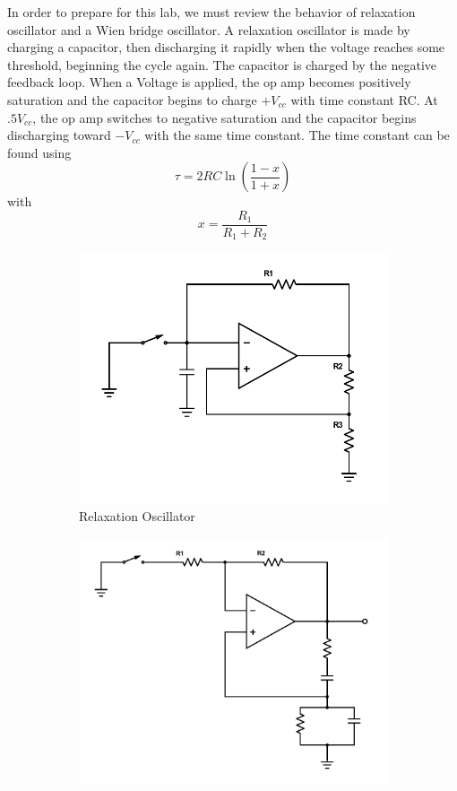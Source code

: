 \documentclass[11pt,letterpaper,onecolumn]{article}
\begin{document}
 In order to prepare for this lab, we must review the behavior of relaxation oscillator and a Wien bridge oscillator. A relaxation oscillator is made by charging a capacitor, then discharging it rapidly when the voltage reaches some threshold, beginning the cycle again. The capacitor is charged by the negative feedback loop. When a Voltage is applied, the op amp becomes positively saturation and the capacitor begins to charge $+V_{cc}$ with time constant RC. At $.5V_{cc}$, the op amp switches to negative saturation and the capacitor begins discharging toward $-V_{cc}$ with the same time constant. The time constant can be found using 
 $$\tau = 2RC\ln\left(\frac{1-x}{1+x}\right)$$
 with 
 $$ x = \frac{R_1}{R_1 + R_2}$$
 
\begin{figure}[H]
\begin{subfigure}{.5\textwidth}
  \centering
  \includegraphics[scale =.6]{Lab-11-fig1.pdf}
  \caption{Relaxation Oscillator}
  \label{fig:sub1}
\end{subfigure}%
\begin{subfigure}{.5\textwidth}
  \centering
  \includegraphics[scale=.5]{Lab-11-fig2.pdf}

\end{subfigure}
\end{figure}
\end{document}
